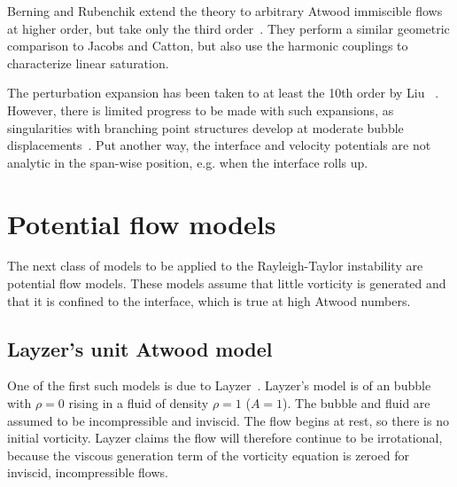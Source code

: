 Berning and Rubenchik extend the theory to arbitrary Atwood immiscible flows at higher order, but take only the third order~\cite{Berning1998}.
They perform a similar geometric comparison to Jacobs and Catton, but also use the harmonic couplings to characterize linear saturation.

The perturbation expansion has been taken to at least the 10th order by Liu \etal~\cite{Wang2010}.
However, there is limited progress to be made with such expansions, as singularities with branching point structures develop at moderate bubble displacements~\cite{Berning1998}.
Put another way, the interface and velocity potentials are not analytic in the span-wise position, e.g. when the interface rolls up.

\section{Potential flow models}

The next class of models to be applied to the Rayleigh-Taylor instability are potential flow models.
These models assume that little vorticity is generated and that it is confined to the interface, which is true at high Atwood numbers.

\subsection{Layzer's unit Atwood model}

One of the first such models is due to Layzer~\cite{Layzer1955}.
Layzer's model is of an bubble with $\rho = 0$ rising in a fluid of density $\rho = 1$ ($A = 1$).
The bubble and fluid are assumed to be incompressible and inviscid.
The flow begins at rest, so there is no initial vorticity.
Layzer claims the flow will therefore continue to be irrotational, because the viscous generation term of the vorticity equation is zeroed for inviscid, incompressible flows.

